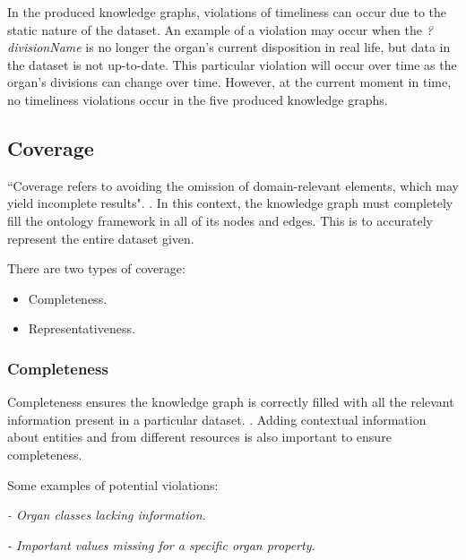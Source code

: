 In the produced knowledge graphs, violations of timeliness can occur due to the static nature of the dataset. An example of a violation may occur when the \textit{?divisionName} is no longer the organ's current disposition in real life, but data in the dataset is not up-to-date. This particular violation will occur over time as the organ's divisions can change over time. However, at the current moment in time, no timeliness violations occur in the five produced knowledge graphs.

\subsection{Coverage}
\hspace{0.5cm} ``Coverage refers to avoiding the omission of domain-relevant elements, which may yield incomplete results". \cite{knowledgegraphevaulationbook}. In this context, the knowledge graph must completely fill the ontology framework in all of its nodes and edges. This is to accurately represent the entire dataset given. 

\noindent There are two types of coverage: 

\vspace{-0.15cm}
\begin{itemize}
\itemsep0em 
\item Completeness.
\vspace{-0.1cm}
\item Representativeness.
\end{itemize}
\vspace{-0.4cm}

\subsubsection{Completeness}
\hspace{0.5cm} Completeness ensures the knowledge graph is correctly filled with all the relevant information present in a particular dataset. \cite{knowledgegraphevaulationbook}. Adding contextual information about entities and from different resources \cite{evaluationpaper} is also important to ensure completeness. 

\noindent Some examples of potential violations:

\vspace{-0.15cm}
\begin{displayquote}
    \textit{- Organ classes lacking information.}
\end{displayquote}
\vspace{-0.6cm}
\begin{displayquote}
    \textit{- Important values missing for a specific organ property.}
\end{displayquote}
\vspace{-0.1cm}

